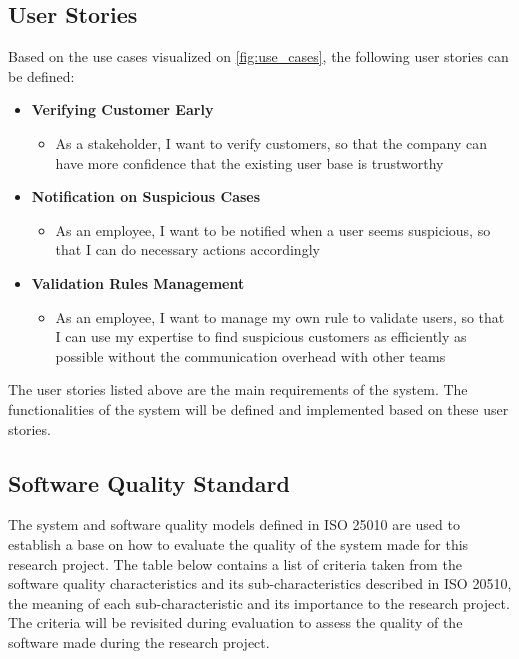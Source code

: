   \newpage
  \subsection{User Stories}
    \label{user_stories}

    Based on the use cases visualized on \autoref{fig:use_cases}, the following user stories can be defined:

    \begin{itemize}
      \item \textbf{Verifying Customer Early}
        \begin{itemize}[label={},leftmargin=*]
          \item As a stakeholder, I want to verify customers, so that the company can have more confidence that the existing user base is trustworthy 
        \end{itemize}

      \item \textbf{Notification on Suspicious Cases}
        \begin{itemize}[label={},leftmargin=*]
          \item As an employee, I want to be notified when a user seems suspicious, so that I can do necessary actions accordingly
        \end{itemize}

      \item \textbf{Validation Rules Management}
        \begin{itemize}[label={},leftmargin=*]
          \item As an employee, I want to manage my own rule to validate users, so that I can use my expertise to find suspicious customers as efficiently as possible without the communication overhead with other teams
        \end{itemize}
    \end{itemize}

    The user stories listed above are the main requirements of the system. The functionalities of the system will be defined and implemented based on these user stories.
    
  \subsection{Software Quality Standard}
    \label{criteria}

    The system and software quality models defined in ISO 25010 \autocite{iso-2011} are used to establish a base on how to evaluate the quality of the system made for this research project. The table below contains a list of criteria taken from the software quality characteristics and its sub-characteristics described in ISO 20510, the meaning of each sub-characteristic and its importance to the research project. The criteria will be revisited during evaluation to assess the quality of the software made during the research project. 

